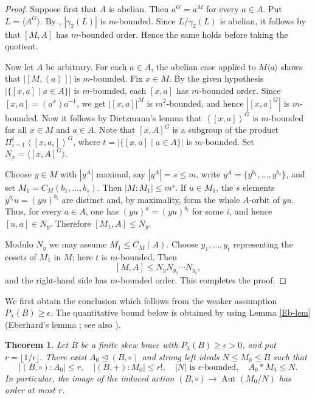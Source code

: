 \documentclass[10pt,a4paper]{amsart}
\numberwithin{equation}{section}
\newtheorem{thm}[equation]{Theorem}
\newcommand{\gen}[1]{\left < #1 \right >}
\newcommand{\Aut}{\operatorname{Aut} }
\begin{document}
\begin{proof}
Suppose first that $A$ is abelian. Then $a^G=a^M$ for every $a\in A$.
Put $L=\langle A^G\rangle$. By \cite[Theorem 2.4]{DS22}, $|\gamma_2(L)|$ is
$m$-bounded. Since $L/\gamma_2(L)$ is abelian,  it follows by
\cite[Lemma 2.2]{DS22} that  $[M,A]$ has $m$-bounded order. Hence
the same holds before taking the quotient.

Now let $A$ be arbitrary. For each $a\in A$, the abelian case applied
to $M\langle a\rangle$ shows that $|[M,\gen{a}]|$ is $m$-bounded. Fix
$x\in M$. By the given hypothesis $|\{[x, a] \mid a \in A\}|$ is  $m$-bounded, each $[x,a]$ has $m$-bounded order. Since $[x,a]=(a^x)a^{-1}$, we get $|[x, a]|^M$ is $m^2$-bounded, and hence $|[x, a]^G|$ is $m$-bounded.   
Now it follows by Dietzmann's
lemma that $\gen{[x, a]}^G$ is $m$-bounded for all $x \in M$ and $a \in A$. Note that $[x, A]^G$ is a subgroup of the product $\Pi_{i=1}^{t} \gen{[x,a_i]}^G$, where $t = |\{[x, a] \mid a \in A\}|$ is $m$-bounded. Set 
$N_x=\langle[x,A]^G\rangle$. 


Choose $y\in M$ with $|y^A|$ maximal, say $|y^A|=s\leqslant m$, write
$y^A=\{y^{b_1},\ldots,y^{b_s}\}$, and set
$M_1=C_M(b_1,\ldots,b_s)$. Then $|M:M_1|\leqslant m^s$. If
$u\in M_1$, the $s$ elements $y^{b_i}u=(yu)^{b_i}$ are distinct and,
by maximality, form the whole $A$-orbit of $yu$. Thus, for every
$a\in A$, one has $(yu)^a=(yu)^{b_i}$ for some $i$, and hence
$[u,a]\in N_y$. Therefore $[M_1,A]\leqslant N_y$.

Modulo $N_y$ we may assume $M_1\leqslant C_M(A)$. Choose
$y_1,\ldots,y_t$ representing the cosets of $M_1$ in $M$; here $t$ is
$m$-bounded. Then
$$
[M,A]\leqslant N_yN_{y_1}\cdots N_{y_t},
$$
and the right-hand side has $m$-bounded order. This completes the proof.
\end{proof}

We first obtain the conclusion which follows from the weaker assumption
$P_\lambda(B)\geqslant\epsilon$. The quantitative bound below is obtained
by using Lemma \ref{Eb-lem} (Eberhard's lemma \cite[Lemma 2.1]{SE15}; see also
\cite[Lemma 2.5]{DS22}).

\begin{thm}\label{thm:Plambda-optimal-form}
Let $B$ be a finite skew brace with $P_\lambda(B)\geqslant\epsilon>0$,
and put $r=\lfloor1/\epsilon\rfloor$. There exist
$A_0\unlhd(B,\circ)$ and strong left ideals $N\leqslant M_0\leqslant B$
such that
$$
|(B,\circ):A_0|\leqslant r,\quad
|(B,+):M_0|\leqslant r!,\quad
|N|\text{ is $\epsilon$-bounded},\quad
A_0*M_0\leqslant N.
$$
In particular, the image of the induced action
$(B,\circ)\to\Aut(M_0/N)$ has order at most $r$.
\end{thm}
\end{document}
